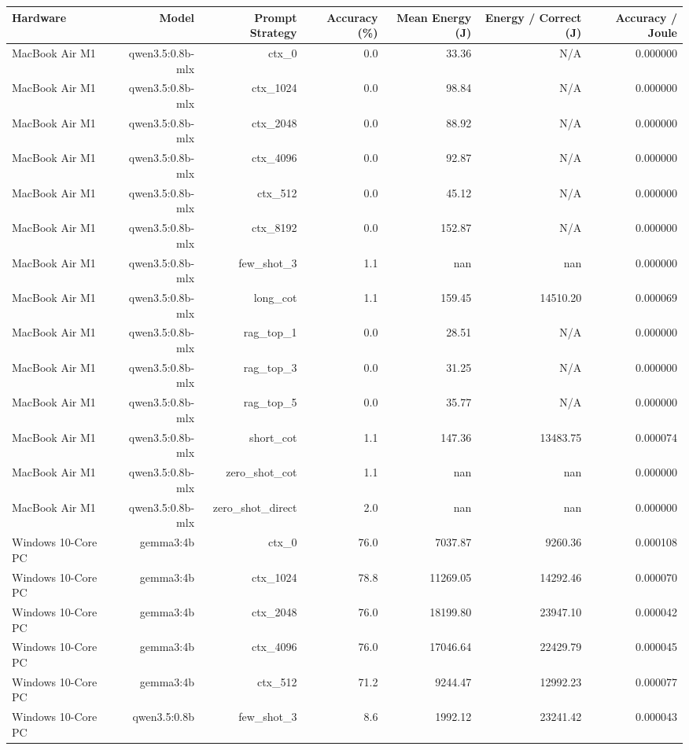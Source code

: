 \begin{tabular}{lrrrrrr}
\hline
Hardware & Model & Prompt Strategy & Accuracy (\%) & Mean Energy (J) & Energy / Correct (J) & Accuracy / Joule \\
\hline
MacBook Air M1 & qwen3.5:0.8b-mlx & ctx\_0 & 0.0 & 33.36 & N/A & 0.000000 \\
MacBook Air M1 & qwen3.5:0.8b-mlx & ctx\_1024 & 0.0 & 98.84 & N/A & 0.000000 \\
MacBook Air M1 & qwen3.5:0.8b-mlx & ctx\_2048 & 0.0 & 88.92 & N/A & 0.000000 \\
MacBook Air M1 & qwen3.5:0.8b-mlx & ctx\_4096 & 0.0 & 92.87 & N/A & 0.000000 \\
MacBook Air M1 & qwen3.5:0.8b-mlx & ctx\_512 & 0.0 & 45.12 & N/A & 0.000000 \\
MacBook Air M1 & qwen3.5:0.8b-mlx & ctx\_8192 & 0.0 & 152.87 & N/A & 0.000000 \\
MacBook Air M1 & qwen3.5:0.8b-mlx & few\_shot\_3 & 1.1 & nan & nan & 0.000000 \\
MacBook Air M1 & qwen3.5:0.8b-mlx & long\_cot & 1.1 & 159.45 & 14510.20 & 0.000069 \\
MacBook Air M1 & qwen3.5:0.8b-mlx & rag\_top\_1 & 0.0 & 28.51 & N/A & 0.000000 \\
MacBook Air M1 & qwen3.5:0.8b-mlx & rag\_top\_3 & 0.0 & 31.25 & N/A & 0.000000 \\
MacBook Air M1 & qwen3.5:0.8b-mlx & rag\_top\_5 & 0.0 & 35.77 & N/A & 0.000000 \\
MacBook Air M1 & qwen3.5:0.8b-mlx & short\_cot & 1.1 & 147.36 & 13483.75 & 0.000074 \\
MacBook Air M1 & qwen3.5:0.8b-mlx & zero\_shot\_cot & 1.1 & nan & nan & 0.000000 \\
MacBook Air M1 & qwen3.5:0.8b-mlx & zero\_shot\_direct & 2.0 & nan & nan & 0.000000 \\
Windows 10-Core PC & gemma3:4b & ctx\_0 & 76.0 & 7037.87 & 9260.36 & 0.000108 \\
Windows 10-Core PC & gemma3:4b & ctx\_1024 & 78.8 & 11269.05 & 14292.46 & 0.000070 \\
Windows 10-Core PC & gemma3:4b & ctx\_2048 & 76.0 & 18199.80 & 23947.10 & 0.000042 \\
Windows 10-Core PC & gemma3:4b & ctx\_4096 & 76.0 & 17046.64 & 22429.79 & 0.000045 \\
Windows 10-Core PC & gemma3:4b & ctx\_512 & 71.2 & 9244.47 & 12992.23 & 0.000077 \\
Windows 10-Core PC & qwen3.5:0.8b & few\_shot\_3 & 8.6 & 1992.12 & 23241.42 & 0.000043 \\

\end{tabular}
